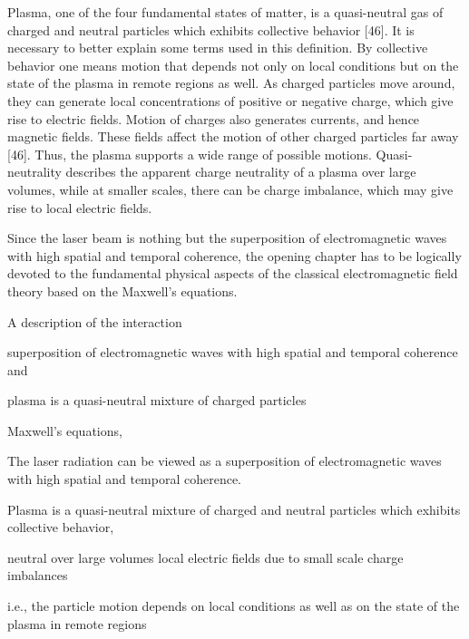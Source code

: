\documentclass[10pt, a4paper, twoside, openright]{report}
\begin{document}
Plasma, one of the four fundamental states of matter, is a quasi-neutral gas of charged and
neutral particles which exhibits collective behavior [46]. It is necessary to better explain some
terms used in this definition.
By collective behavior one means motion that depends not only on local conditions but
on the state of the plasma in remote regions as well. As charged particles move around, they
can generate local concentrations of positive or negative charge, which give rise to electric
fields. Motion of charges also generates currents, and hence magnetic fields. These fields
affect the motion of other charged particles far away [46]. Thus, the plasma supports a wide
range of possible motions.
Quasi-neutrality describes the apparent charge neutrality of a plasma over large volumes,
while at smaller scales, there can be charge imbalance, which may give rise to local electric
fields. 

Since the laser beam is nothing but the superposition of electromagnetic waves with high
spatial and temporal coherence, the opening chapter has to be logically devoted to the fundamental physical aspects of the classical electromagnetic field theory based on the Maxwell’s
equations.

A description of the interaction 

superposition of electromagnetic waves with high spatial and temporal coherence and 

plasma is a quasi-neutral mixture of charged particles


Maxwell's equations,


The laser radiation can be viewed as a superposition of electromagnetic waves with high spatial and temporal coherence. 

Plasma is a quasi-neutral mixture of charged and neutral particles which exhibits collective behavior,

neutral over large volumes local electric fields due to small scale charge imbalances

i.e., the particle motion depends on local conditions as well as on the state of the plasma in remote regions

%

%

%
\end{document}
